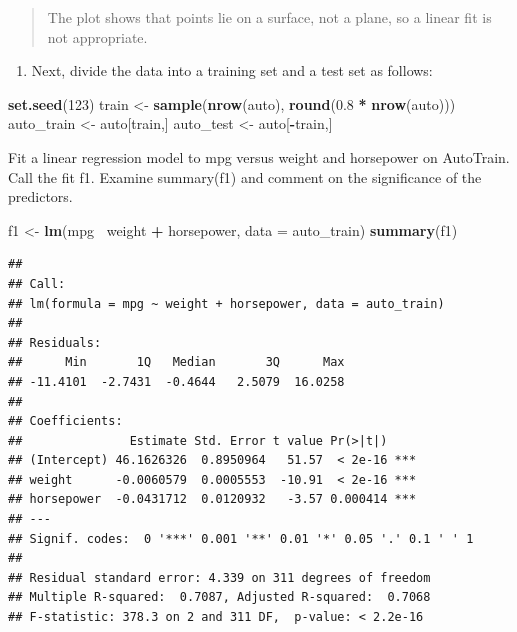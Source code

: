 \documentclass[]{article}
\newenvironment{Shaded}{\begin{snugshade}}{\end{snugshade}}
\newcommand{\CommentTok}[1]{\textcolor[rgb]{0.56,0.35,0.01}{\textit{#1}}}
\newcommand{\DataTypeTok}[1]{\textcolor[rgb]{0.13,0.29,0.53}{#1}}
\newcommand{\DecValTok}[1]{\textcolor[rgb]{0.00,0.00,0.81}{#1}}
\newcommand{\FloatTok}[1]{\textcolor[rgb]{0.00,0.00,0.81}{#1}}
\newcommand{\KeywordTok}[1]{\textcolor[rgb]{0.13,0.29,0.53}{\textbf{#1}}}
\newcommand{\NormalTok}[1]{#1}
\newcommand{\OperatorTok}[1]{\textcolor[rgb]{0.81,0.36,0.00}{\textbf{#1}}}
\newcommand{\StringTok}[1]{\textcolor[rgb]{0.31,0.60,0.02}{#1}}
\providecommand{\tightlist}{%
  \setlength{\itemsep}{0pt}\setlength{\parskip}{0pt}}
\begin{document}
\begin{Shaded}
\end{Shaded}

\begin{quote}
The plot shows that points lie on a surface, not a plane, so a linear
fit is not appropriate.
\end{quote}

\begin{enumerate}
\def\labelenumi{(\alph{enumi})}
\setcounter{enumi}{2}
\tightlist
\item
  Next, divide the data into a training set and a test set as follows:
\end{enumerate}

\begin{Shaded}
\begin{Highlighting}[]
\KeywordTok{set.seed}\NormalTok{(}\DecValTok{123}\NormalTok{)}
\NormalTok{train <-}\StringTok{ }\KeywordTok{sample}\NormalTok{(}\KeywordTok{nrow}\NormalTok{(auto), }\KeywordTok{round}\NormalTok{(}\FloatTok{0.8} \OperatorTok{*}\StringTok{ }\KeywordTok{nrow}\NormalTok{(auto)))}
\NormalTok{auto_train <-}\StringTok{ }\NormalTok{auto[train,]}
\NormalTok{auto_test <-}\StringTok{ }\NormalTok{auto[}\OperatorTok{-}\NormalTok{train,]}
\end{Highlighting}
\end{Shaded}

Fit a linear regression model to mpg versus weight and horsepower on
AutoTrain. Call the fit f1. Examine summary(f1) and comment on the
significance of the predictors.

\begin{Shaded}
\begin{Highlighting}[]
\NormalTok{f1 <-}\StringTok{ }\KeywordTok{lm}\NormalTok{(mpg }\OperatorTok{~}\NormalTok{weight }\OperatorTok{+}\StringTok{ }\NormalTok{horsepower, }\DataTypeTok{data =}\NormalTok{ auto_train)}
\KeywordTok{summary}\NormalTok{(f1)}
\end{Highlighting}
\end{Shaded}

\begin{verbatim}
## 
## Call:
## lm(formula = mpg ~ weight + horsepower, data = auto_train)
## 
## Residuals:
##      Min       1Q   Median       3Q      Max 
## -11.4101  -2.7431  -0.4644   2.5079  16.0258 
## 
## Coefficients:
##               Estimate Std. Error t value Pr(>|t|)    
## (Intercept) 46.1626326  0.8950964   51.57  < 2e-16 ***
## weight      -0.0060579  0.0005553  -10.91  < 2e-16 ***
## horsepower  -0.0431712  0.0120932   -3.57 0.000414 ***
## ---
## Signif. codes:  0 '***' 0.001 '**' 0.01 '*' 0.05 '.' 0.1 ' ' 1
## 
## Residual standard error: 4.339 on 311 degrees of freedom
## Multiple R-squared:  0.7087, Adjusted R-squared:  0.7068 
## F-statistic: 378.3 on 2 and 311 DF,  p-value: < 2.2e-16
\end{verbatim}
\end{document}
